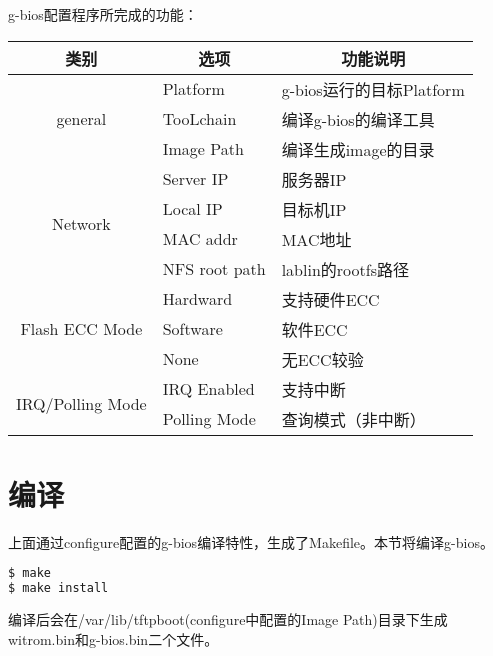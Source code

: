 g-bios配置程序所完成的功能：
\begin{table}[htbp]
\centering
\setlength{\parindent}{0pt}
\begin{tabular}{|c|l|l|}
\hline
类别 & \multicolumn{1}{|c|}{选项} & \multicolumn{1}{|c|}{功能说明} \\ \hline
\multirow{3}{*}{general} & Platform & g-bios运行的目标Platform \\ \cline{2-3}
		& TooLchain & 编译g-bios的编译工具 \\ \cline{2-3}
		& Image Path & 编译生成image的目录 \\ \hline
\multirow{4}{*}{Network} & Server IP & 服务器IP \\ \cline{2-3}
		& Local IP & 目标机IP \\ \cline{2-3}
		& MAC addr & MAC地址\\ \cline{2-3}
		& NFS root path &  lablin的rootfs路径\\ \hline
\multirow{3}{*}{Flash ECC Mode}   & Hardward & 支持硬件ECC\\ \cline{2-3}
		& Software & 软件ECC\\ \cline{2-3}
		& None & 无ECC较验\\ \cline{2-3}
\multirow{2}{*}{IRQ/Polling Mode} & IRQ Enabled & 支持中断 \\ \cline{2-3}
		& Polling Mode & 查询模式（非中断）\\ \hline
\end{tabular}
\end{table}


\section{编译}
上面通过configure配置的g-bios编译特性，生成了Makefile。本节将编译g-bios。
\begin{lstlisting}[language=bash,numbers=none]
$ make
$ make install
\end{lstlisting}
编译后会在/var/lib/tftpboot(configure中配置的Image Path)目录下生成witrom.bin和g-bios.bin二个文件。

